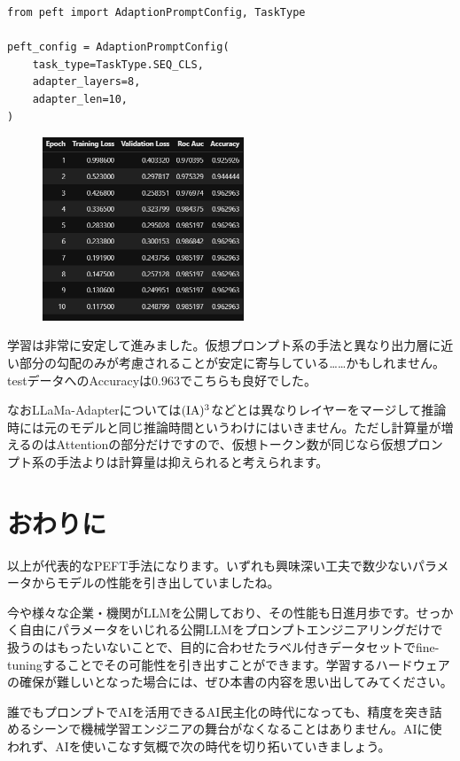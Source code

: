 \documentclass[a5paper,twoside,dvipdfmx]{jsarticle}
\begin{document}
\begin{lstlisting}
from peft import AdaptionPromptConfig, TaskType

peft_config = AdaptionPromptConfig(
    task_type=TaskType.SEQ_CLS,
    adapter_layers=8,
    adapter_len=10,
)
\end{lstlisting}



\begin{figure}[h]
  \centering
  \includegraphics[width=60mm]{../C105Fig/gray/llama_adapter_train.png}
 \end{figure} 

学習は非常に安定して進みました。仮想プロンプト系の手法と異なり出力層に近い部分の勾配のみが考慮されることが安定に寄与している……かもしれません。testデータへのAccuracyは0.963でこちらも良好でした。

なおLLaMa-Adapterについては$\rm{(IA)^3}$などとは異なりレイヤーをマージして推論時には元のモデルと同じ推論時間というわけにはいきません。ただし計算量が増えるのはAttentionの部分だけですので、仮想トークン数が同じなら仮想プロンプト系の手法よりは計算量は抑えられると考えられます。

\newpage

\section{おわりに}

以上が代表的なPEFT手法になります。いずれも興味深い工夫で数少ないパラメータからモデルの性能を引き出していましたね。

今や様々な企業・機関がLLMを公開しており、その性能も日進月歩です。せっかく自由にパラメータをいじれる公開LLMをプロンプトエンジニアリングだけで扱うのはもったいないことで、目的に合わせたラベル付きデータセットでfine-tuningすることでその可能性を引き出すことができます。学習するハードウェアの確保が難しいとなった場合には、ぜひ本書の内容を思い出してみてください。

誰でもプロンプトでAIを活用できるAI民主化の時代になっても、精度を突き詰めるシーンで機械学習エンジニアの舞台がなくなることはありません。AIに使われず、AIを使いこなす気概で次の時代を切り拓いていきましょう。
\end{document}
